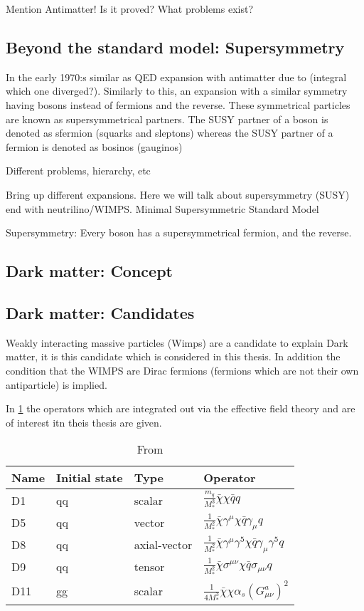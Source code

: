 Mention Antimatter!
Is it proved? What problems exist? 

\subsection{Beyond the standard model: Supersymmetry}
In the early 1970:s similar as QED expansion with antimatter due to (integral which one diverged?). Similarly to this, an expansion with a similar symmetry having bosons instead of fermions and the reverse. These symmetrical particles are known as supersymmetrical partners. The SUSY partner of a boson is denoted as sfermion (squarks and sleptons) whereas the SUSY partner of a fermion is denoted as bosinos (gauginos)

Different problems, hierarchy, etc

Bring up different expansions. Here we will talk about supersymmetry (SUSY) end with neutrilino/WIMPS. 
Minimal Supersymmetric Standard Model

Supersymmetry: Every boson has a supersymmetrical fermion, and the reverse.
\subsection{Dark matter: Concept}
\subsection{Dark matter: Candidates}
Weakly interacting massive particles (Wimps) are a candidate to explain Dark matter, it is this candidate which is considered in this thesis.
In addition the condition that the WIMPS are Dirac fermions (fermions which are not their own antiparticle) is implied.

In \ref{tab:operators} the operators which are integrated out via the effective field theory and are of interest itn theis thesis are given.
\renewcommand{\arraystretch}{1.5} %
\begin{table}[H]
\begin{center}
    \begin{tabular}{ | l | l | l | l |}
    \hline
    Name & Initial state & Type & Operator \\ \hline
  	D1 & qq & scalar & $\frac{m_q}{M^3_*} \bar{\chi} \chi \bar{q} q$ \\ \hline
  	D5 & qq & vector & $\frac{1}{M^2_*} \bar{\chi} \gamma^\mu \chi \bar{q} \gamma_\mu q$ \\ \hline
  	D8 & qq & axial-vector & $\frac{1}{M^2_*}\bar{\chi}\gamma^\mu \gamma^5 \chi \bar{q} \gamma_\mu \gamma^5 q $ \\ \hline
  	D9 & qq & tensor & $\frac{1}{M^2_*} \bar{\chi}\sigma^{\mu \nu} \chi \bar{q} \sigma_{\mu \nu} q  $\\ \hline
  	D11 & gg & scalar & $\frac{1}{4M^3_*}\bar{\chi}\chi \alpha_s (G^a_{\mu \nu})^2 $\\ \hline
  	\end{tabular}

  	\caption{From \citep{CERN-PH-EP-2012-210}}
  	\label{tab:operators}
  	  	\end{center}
    \end{table}
\renewcommand{\arraystretch}{1.0}  %
